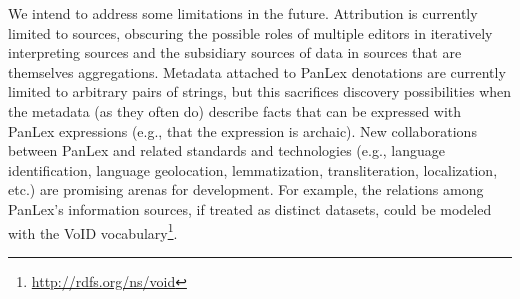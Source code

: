\documentclass[sw]{iosart2c}
\begin{document}
We intend to address some limitations in the future. Attribution is currently limited to sources, obscuring the possible roles of multiple editors in iteratively interpreting sources and the subsidiary sources of data in sources that are themselves aggregations. Metadata attached to PanLex denotations are currently limited to arbitrary pairs of strings, but this sacrifices discovery possibilities when the metadata (as they often do) describe facts that can be expressed with PanLex expressions (e.g., that the expression is archaic). New collaborations between PanLex and related standards and technologies (e.g., language identification, language geolocation, lemmatization, transliteration, localization, etc.) are promising arenas for development. For example, the relations among PanLex's information sources, if treated as distinct datasets, could be modeled with the VoID vocabulary\footnote{\url{http://rdfs.org/ns/void}}.



\end{document}
